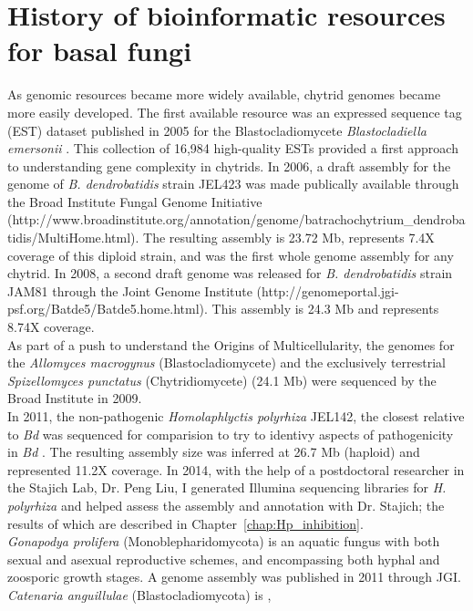 \section{History of bioinformatic resources for basal fungi}
As genomic resources became more widely available, chytrid genomes became more easily developed. The first available resource was an expressed sequence tag (EST) dataset published in 2005 for the Blastocladiomycete \textit{Blastocladiella emersonii} \cite{Ribichich2005}. This collection of 16,984 high-quality ESTs provided a first approach to understanding gene complexity in chytrids. In 2006, a draft assembly for the genome of \textit{B. dendrobatidis} strain JEL423 was made publically available through the Broad Institute Fungal Genome Initiative (http://www.broadinstitute.org/annotation/genome/batrachochytrium\_dendrobatidis/MultiHome.html). The resulting assembly is 23.72 Mb, represents 7.4X coverage of this diploid strain, and was the first whole genome assembly for any chytrid. In 2008, a second draft genome was released for \textit{B. dendrobatidis} strain JAM81 through the Joint Genome Institute (http://genomeportal.jgi-psf.org/Batde5/Batde5.home.html). This assembly is 24.3 Mb and represents 8.74X coverage. \\
\indent As part of a push to understand the Origins of Multicellularity, the genomes for the \textit{Allomyces macrogynus} (Blastocladiomycete) and the exclusively terrestrial \textit{Spizellomyces punctatus} (Chytridiomycete) (24.1 Mb) were sequenced by the Broad Institute in 2009. \\
\indent In 2011, the non-pathogenic \textit{Homolaphlyctis polyrhiza} JEL142, the closest relative to \textit{Bd} was sequenced for comparision to try to identivy aspects of pathogenicity in \textit{Bd} \cite{Joneson2011}. The resulting assembly size was inferred at 26.7 Mb (haploid) and represented 11.2X coverage. In 2014, with the help of a postdoctoral researcher in the Stajich Lab, Dr. Peng Liu, I generated Illumina sequencing libraries for \textit{H. polyrhiza} and helped assess the assembly and annotation with Dr. Stajich; the results of which are described in Chapter~\ref{chap:Hp_inhibition}.\\
\indent \textit{Gonapodya prolifera} (Monoblepharidomycota) is an aquatic fungus with both sexual and asexual reproductive schemes, and encompassing both hyphal and zoosporic growth stages. A genome assembly was published in 2011 through JGI. \textit{Catenaria anguillulae} (Blastocladiomycota) is , \\
